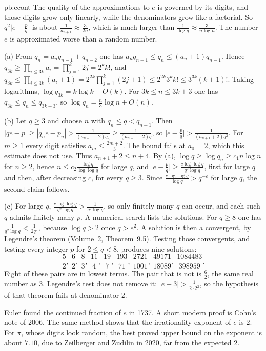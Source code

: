 \begin{solution}{pb:econt}
\idea The quality of the approximations to $e$ is governed by its digits, and those digits grow only linearly, while the denominators grow like a factorial. So $q^2\bigl|e-\frac pq\bigr|$ is about $\frac1{a_{n+1}}\approx\frac3{2n}$, which is much larger than $\frac1{\log q}\approx\frac3{n\log n}$. The number $e$ is approximated worse than a random number.

\writeup (a) From $q_n=a_nq_{n-1}+q_{n-2}$ one has $a_nq_{n-1}\le q_n\le(a_n+1)q_{n-1}$. Hence $q_{3k}\ge\prod_{i\le 3k}a_i=\prod_{j=1}^k 2j=2^kk!$, and $q_{3k}\le\prod_{i\le 3k}(a_i+1)=2^{2k}\prod_{j=1}^k(2j+1)\le 2^{2k}3^kk!\le 3^{3k}(k+1)!$. Taking logarithms, $\log q_{3k}=k\log k+O(k)$. For $3k\le n\le 3k+3$ one has $q_{3k}\le q_n\le q_{3k+3}$, so $\log q_n=\frac n3\log n+O(n)$.

(b) Let $q\ge 3$ and choose $n$ with $q_n\le q<q_{n+1}$. Then $|qe-p|\ge|q_ne-p_n|>\frac1{(a_{n+1}+2)q_n}\ge\frac1{(a_{n+1}+2)q}$, so $\bigl|e-\frac pq\bigr|>\frac1{(a_{n+1}+2)q^2}$. For $m\ge 1$ every digit satisfies $a_m\le\frac{2m+2}3$. The bound fails at $a_0=2$, which this estimate does not use. Thus $a_{n+1}+2\le n+4$. By (a), $\log q\ge\log q_n\ge c_1 n\log n$ for $n\ge 2$, hence $n\le c_2\frac{\log q}{\log\log q}$ for large $q$, and $\bigl|e-\frac pq\bigr|\ge\frac{c\log\log q}{q^2\log q}$, first for large $q$ and then, after decreasing $c$, for every $q\ge 3$. Since $\frac{c\log\log q}{\log q}>q^{-\varepsilon}$ for large $q$, the second claim follows.

(c) For large $q$, $\frac{c\log\log q}{q^2\log q}>\frac1{q^2\log q}$, so only finitely many $q$ can occur, and each such $q$ admits finitely many $p$. A numerical search lists the solutions. For $q\ge 8$ one has $\frac1{q^2\log q}<\frac1{2q^2}$, because $\log q>2$ once $q>e^2$. A solution is then a convergent, by Legendre's theorem (Volume~2, Theorem~9.5). Testing those convergents, and testing every integer $p$ for $2\le q<8$, produces nine solutions:
\[
\frac52,\ \frac62,\ \frac83,\ \frac{11}4,\ \frac{19}7,\ \frac{193}{71},\ \frac{2721}{1001},\ \frac{49171}{18089},\ \frac{1084483}{398959}.
\]
Eight of these pairs are in lowest terms. The pair that is not is $\frac62$, the same real number as $3$. Legendre's test does not remove it: $\bigl|e-3\bigr|>\frac1{2\cdot 2^2}$, so the hypothesis of that theorem fails at denominator $2$.

\leads Euler found the continued fraction of $e$ in 1737. A short modern proof is Cohn's note of 2006. The same method shows that the irrationality exponent of $e$ is $2$. For $\pi$, whose digits look random, the best proved upper bound on the exponent is about $7.10$, due to Zeilberger and Zudilin in 2020, far from the expected $2$.
\end{solution}

